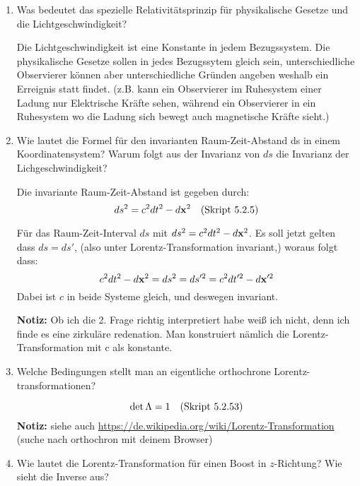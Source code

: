 \begin{enumerate}
  \item Was bedeutet das spezielle Relativitätsprinzip für physikalische
    Gesetze und die Lichtgeschwindigkeit?

    Die Lichtgeschwindigkeit ist eine Konstante in jedem Bezugssystem.
    Die physikalische Gesetze sollen in jedes Bezugssytem gleich sein,
    unterschiedliche Observierer können aber unterschiedliche Gründen
    angeben weshalb ein Erreignis statt findet. (z.B. kann ein Observierer
    im Ruhesystem einer Ladung nur Elektrische Kräfte sehen, während
    ein Observierer in ein Ruhesystem wo die Ladung sich bewegt auch
    magnetische Kräfte sieht.) 

  \item Wie lautet die Formel für den invarianten Raum-Zeit-Abstand ds in
    einem Koordinatensystem? Warum folgt aus der Invarianz von $ds$ die
    Invarianz der Lichgeschwindigkeit?
    
    Die invariante Raum-Zeit-Abstand ist gegeben durch:
    \begin{equation*}
      ds^2 = c^2 dt^2 - d\vb x^2
      \quad\text{(Skript 5.2.5)}
    \end{equation*}

      Für das Raum-Zeit-Interval $ds$ mit $ds^2=c^2dt^2-d\vb x^2$. Es soll
      jetzt gelten dass $ds=ds'$, (also unter Lorentz-Transformation 
      invariant,) woraus folgt dass:
      \begin{equation*}
        c^2dt^2-d\vb x^2 = ds^2 = ds'^2 = c^2dt'^2 - d\vb x'^2 
      \end{equation*}
      Dabei ist $c$ in beide Systeme gleich, und deswegen invariant.
      
      \textbf{Notiz:} Ob ich die 2. Frage richtig interpretiert habe
      weiß ich nicht, denn ich finde es eine zirkuläre redenation.
      Man konstruiert nämlich die Lorentz-Transformation mit c als
      konstante.

  \item Welche Bedingungen stellt man an eigentliche orthochrone
    Lorentz-transformationen?

    $$\det \Lambda = 1 \quad\text{(Skript 5.2.53)}$$
    \textbf{Notiz:} siehe auch 
    \url{https://de.wikipedia.org/wiki/Lorentz-Transformation} (suche 
    nach orthochron mit deinem Browser)

  \item Wie lautet die Lorentz-Transformation für einen Boost in 
    $z$-Richtung? Wie sieht die Inverse aus?
    

\end{enumerate}
